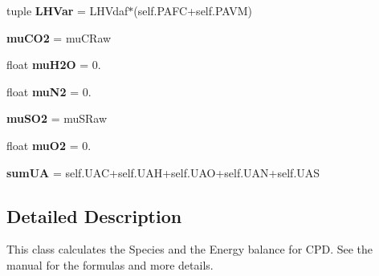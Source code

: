 \begin{DoxyCompactItemize}
\item 
\hypertarget{classCompos__and__Energy_1_1CPD__SpeciesBalance_af9f1b9cd71975f51962628577605391f}{tuple {\bfseries \-L\-H\-Var} = \-L\-H\-Vdaf$\ast$(self.\-P\-A\-F\-C+self.\-P\-A\-V\-M)}\label{classCompos__and__Energy_1_1CPD__SpeciesBalance_af9f1b9cd71975f51962628577605391f}

\item 
\hypertarget{classCompos__and__Energy_1_1CPD__SpeciesBalance_af840481e652bc3983f9098da223731a0}{{\bfseries mu\-C\-O2} = mu\-C\-Raw}\label{classCompos__and__Energy_1_1CPD__SpeciesBalance_af840481e652bc3983f9098da223731a0}

\item 
\hypertarget{classCompos__and__Energy_1_1CPD__SpeciesBalance_a9ba799336e7a9d65dd21da9d1e3689bc}{float {\bfseries mu\-H2\-O} = 0.}\label{classCompos__and__Energy_1_1CPD__SpeciesBalance_a9ba799336e7a9d65dd21da9d1e3689bc}

\item 
\hypertarget{classCompos__and__Energy_1_1CPD__SpeciesBalance_a7338301550278542304fd2dc2b72c5fe}{float {\bfseries mu\-N2} = 0.}\label{classCompos__and__Energy_1_1CPD__SpeciesBalance_a7338301550278542304fd2dc2b72c5fe}

\item 
\hypertarget{classCompos__and__Energy_1_1CPD__SpeciesBalance_a6bc192180926cbf92cd789bcf6f3176c}{{\bfseries mu\-S\-O2} = mu\-S\-Raw}\label{classCompos__and__Energy_1_1CPD__SpeciesBalance_a6bc192180926cbf92cd789bcf6f3176c}

\item 
\hypertarget{classCompos__and__Energy_1_1CPD__SpeciesBalance_a08b26e41f7d616dcca46b53fee7f240c}{float {\bfseries mu\-O2} = 0.}\label{classCompos__and__Energy_1_1CPD__SpeciesBalance_a08b26e41f7d616dcca46b53fee7f240c}

\item 
\hypertarget{classCompos__and__Energy_1_1SpeciesBalance_a57d64961c8e035bf8087528adf669379}{{\bfseries sum\-U\-A} = self.\-U\-A\-C+self.\-U\-A\-H+self.\-U\-A\-O+self.\-U\-A\-N+self.\-U\-A\-S}\label{classCompos__and__Energy_1_1SpeciesBalance_a57d64961c8e035bf8087528adf669379}

\end{DoxyCompactItemize}


\subsection{\-Detailed \-Description}
\begin{DoxyVerb}This class calculates the Species and the Energy balance for CPD. See the manual for the formulas and more details.\end{DoxyVerb}
 


